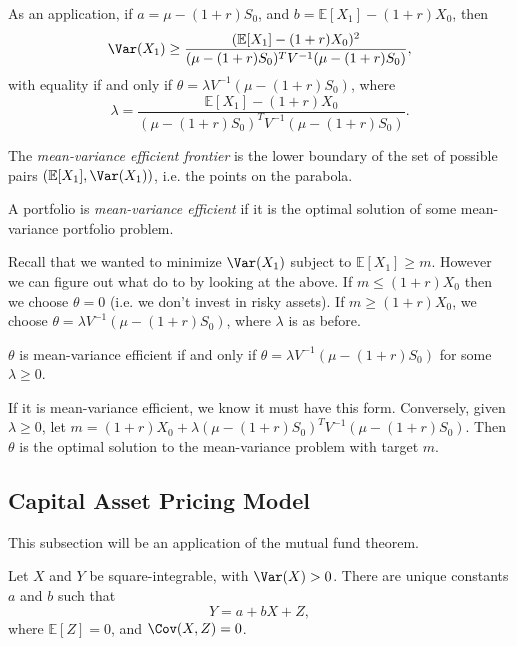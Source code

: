 \documentclass[12pt]{article}
\begin{document}
As an application, if $a = \mu - (1 + r)S_0$, and $b = \mathbb{E}[X_1] - (1+r)X_0$, then
\[
\Var(X_1) \geq \frac{(\mathbb{E}[X_1] - (1+r)X_0)^2}{(\mu - (1+r)S_0)^{T}V^{-1}(\mu - (1+r)S_0)},
\]
with equality if and only if $\theta = \lambda V^{-1}(\mu - (1+r)S_0)$, where
\[
\lambda = \frac{\mathbb{E}[X_1] - (1+r)X_0}{(\mu - (1+r)S_0)^{T}V^{-1}(\mu - (1+r)S_0)}.
\]

\begin{definition}
	The \emph{mean-variance efficient frontier} is the lower boundary of the set of possible pairs $(\mathbb{E}[X_1], \Var(X_1))$, i.e. the points on the parabola.

	A portfolio is \emph{mean-variance efficient} if it is the optimal solution of some mean-variance portfolio problem.
\end{definition}

Recall that we wanted to minimize $\Var(X_1)$ subject to $\mathbb{E}[X_1] \geq m$. However we can figure out what do to by looking at the above. If $m \leq (1+r)X_0$ then we choose $\theta = 0$ (i.e. we don't invest in risky assets). If $m \geq (1+r)X_0$, we choose $\theta = \lambda V^{-1} (\mu - (1+r)S_0)$, where $\lambda$ is as before.

\begin{theorem}
	$\theta$ is mean-variance efficient if and only if $\theta = \lambda V^{-1}(\mu - (1+r)S_0)$ for some $\lambda \geq 0$.
\end{theorem}

\begin{proofbox}
	If it is mean-variance efficient, we know it must have this form. Conversely, given $\lambda \geq 0$, let $m = (1+r)X_0 + \lambda(\mu - (1+r)S_0)^{T} V^{-1} (\mu - (1+r)S_0)$.  Then $\theta$ is the optimal solution to the mean-variance problem with target $m$.
\end{proofbox}

\subsection{Capital Asset Pricing Model}
\label{sub:capm}

This subsection will be an application of the mutual fund theorem.

\begin{theorem}
	Let $X$ and $Y$ be square-integrable, with $\Var(X) > 0$. There are unique constants $a$ and $b$ such that
	\[
	Y = a + bX + Z,
	\]
	where $\mathbb{E}[Z] = 0$, and $\Cov(X, Z) = 0$.
\end{theorem}
\end{document}

